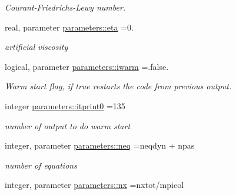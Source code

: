 \begin{DoxyCompactItemize}
\begin{DoxyCompactList}\small\item\em Courant-\/\+Friedrichs-\/\+Lewy number. \end{DoxyCompactList}\item 
\hypertarget{namespaceparameters_a0f11692236dfb49ab2bb451103faf8f1}{}real, parameter \hyperlink{namespaceparameters_a0f11692236dfb49ab2bb451103faf8f1}{parameters\+::eta} =0.\label{namespaceparameters_a0f11692236dfb49ab2bb451103faf8f1}

\begin{DoxyCompactList}\small\item\em artificial viscosity \end{DoxyCompactList}\item 
\hypertarget{namespaceparameters_afc7a92e21b69eb6d20e4488030bd1300}{}logical, parameter \hyperlink{namespaceparameters_afc7a92e21b69eb6d20e4488030bd1300}{parameters\+::iwarm} =.false.\label{namespaceparameters_afc7a92e21b69eb6d20e4488030bd1300}

\begin{DoxyCompactList}\small\item\em Warm start flag, if true restarts the code from previous output. \end{DoxyCompactList}\item 
\hypertarget{namespaceparameters_af9639278be37d485bbe316a0a4389157}{}integer \hyperlink{namespaceparameters_af9639278be37d485bbe316a0a4389157}{parameters\+::itprint0} =135\label{namespaceparameters_af9639278be37d485bbe316a0a4389157}

\begin{DoxyCompactList}\small\item\em number of output to do warm start \end{DoxyCompactList}\item 
\hypertarget{namespaceparameters_a37fe125b9070b83bc96f133a6485b0f2}{}integer, parameter \hyperlink{namespaceparameters_a37fe125b9070b83bc96f133a6485b0f2}{parameters\+::neq} =neqdyn + npas\label{namespaceparameters_a37fe125b9070b83bc96f133a6485b0f2}

\begin{DoxyCompactList}\small\item\em number of equations \end{DoxyCompactList}\item 
\hypertarget{namespaceparameters_a1a3b8ba995adb2f1c093cdc8b37eb5bd}{}integer, parameter \hyperlink{namespaceparameters_a1a3b8ba995adb2f1c093cdc8b37eb5bd}{parameters\+::nx} =nxtot/mpicol\label{namespaceparameters_a1a3b8ba995adb2f1c093cdc8b37eb5bd}


\end{DoxyCompactItemize}
